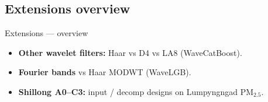 
\subsection{Extensions overview}
\begin{frame}{Extensions --- overview}
  \begin{itemize}\setlength\itemsep{0.4em}
    \item \textbf{Other wavelet filters:} Haar vs D4 vs LA8 (WaveCatBoost).
    \item \textbf{Fourier bands} vs Haar MODWT (WaveLGB).
    \item \textbf{Shillong A0--C3:} input / decomp designs on Lumpyngngad PM$_{2.5}$.
  \end{itemize}
\end{frame}

